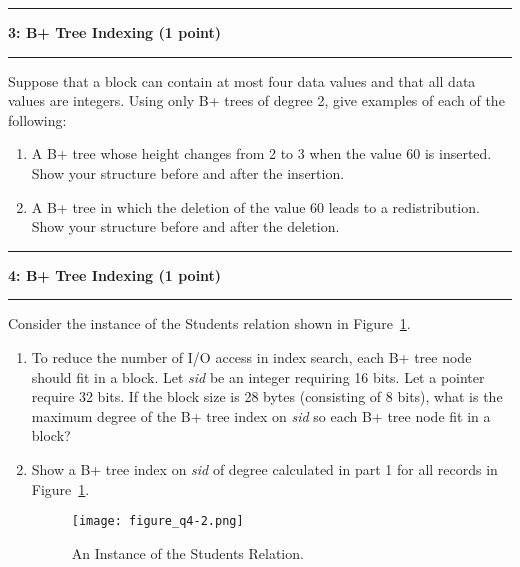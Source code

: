 \documentclass[11pt]{article}
\newcommand\question[2]{\vspace{.25in}\hrule\textbf{#1: #2}\vspace{.5em}\hrule\vspace{.10in}}
\begin{document}
\question{3}{B+ Tree Indexing (1 point)}
Suppose that a block can contain at most four data values and that all data values are integers. Using only B+ trees of degree 2, give examples of each of the following:
\begin{enumerate}
	\item A B+ tree whose height changes from 2 to 3 when the value 60 is inserted. Show your structure before and after the insertion.
	

	
	\item A B+ tree in which the deletion of the value 60 leads to a redistribution. Show your structure before and after the deletion.
	

\end{enumerate}


\question{4}{B+ Tree Indexing (1 point)}
Consider the instance of the Students relation shown in Figure~\ref{figure:q4}. 
\begin{enumerate}
	
	\item To reduce the number of I/O access in index search, each B+ tree node should fit in a block. Let {\it sid} be an integer requiring 16 bits. Let a pointer require 32 bits.
	If the block size is 28 bytes (consisting of 8 bits), what is the maximum degree of the B+ tree index on {\it sid} so each B+ tree node fit in a block?
	

	\item Show a B+ tree index on {\it sid} of degree calculated in part 1 for all records in Figure~\ref{figure:q4}.
	
	\begin{figure}[h]
		\centering
		\texttt{[image: figure\_q4-2.png]}
		\caption{An Instance of the Students Relation.}
		\label{figure:q4}
	\end{figure}
	

	
	
	

\end{enumerate}
\end{document}
